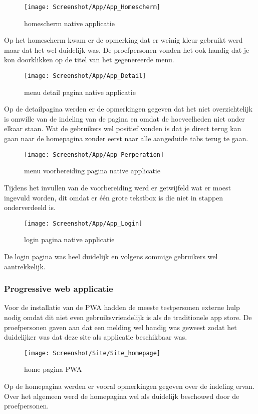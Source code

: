 \begin{figure}[H]
	\texttt{[image: Screenshot/App/App\_Homescherm]}\centering
	\caption{homescherm native applicatie}
\end{figure}
Op het homescherm kwam er de opmerking dat er weinig kleur gebruikt werd maar dat het wel duidelijk was. De proefpersonen vonden het ook handig dat je kon doorklikken op de titel van het gegenereerde menu.

\begin{figure}[H]
	\texttt{[image: Screenshot/App/App\_Detail]}\centering
	\caption{menu detail pagina native applicatie}
\end{figure}
Op de detailpagina werden er de opmerkingen gegeven dat het niet overzichtelijk is omwille van de indeling van de pagina en omdat de hoeveelheden niet onder elkaar staan. Wat de gebruikers wel positief vonden is dat je direct terug kan gaan naar de homepagina zonder eerst naar alle aangeduide tabs terug te gaan.

\begin{figure}[H]
	\texttt{[image: Screenshot/App/App\_Perperation]}\centering
	\caption{menu voorbereiding pagina native applicatie}
\end{figure}
Tijdens het invullen van de voorbereiding werd er getwijfeld wat er moest ingevuld worden, dit omdat er één grote tekstbox is die niet in stappen onderverdeeld is.

\begin{figure}[H]
	\texttt{[image: Screenshot/App/App\_Login]}\centering
	\caption{login pagina native applicatie}
\end{figure}
De login pagina was heel duidelijk en volgens sommige gebruikers wel aantrekkelijk.

\subsubsection{Progressive web applicatie}
Voor de installatie van de PWA hadden de meeste testpersonen externe hulp nodig omdat dit niet even gebruiksvriendelijk is als de traditionele app store. De proefpersonen gaven aan dat een melding wel handig was geweest zodat het duidelijker was dat deze site als applicatie beschikbaar was.

\begin{figure}[H]
	\texttt{[image: Screenshot/Site/Site\_homepage]}\centering
	\caption{home pagina PWA}
\end{figure}
Op de homepagina werden er vooral opmerkingen gegeven over de indeling ervan. Over het algemeen werd de homepagina wel als duidelijk beschouwd door de proefpersonen.

